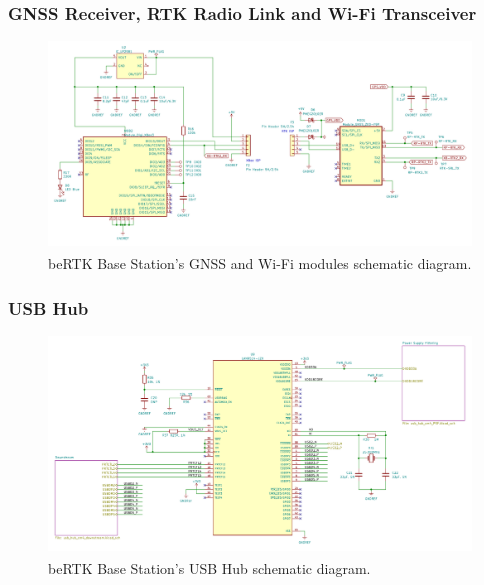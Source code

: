 
\subsubsection{GNSS Receiver, RTK Radio Link and Wi-Fi Transceiver}\label{sec:3232_ZEDF9P_XBEE3}

\begin{figure}[h]
	\centering
	\includegraphics[width=1.0\textwidth]{Chapters/Figures/chapter3/Modules_ZEDF9P_XBEE3.pdf}
	\caption{beRTK\textsuperscript{\textregistered} Base Station's GNSS and Wi-Fi modules schematic diagram.}
	\label{fig:ZEDF9P_XBEE3_circuit}
\end{figure}

\subsubsection{USB Hub}\label{sec:3233_LAN9514}

\begin{figure}[h]
	\centering
	\includegraphics[width=1.0\textwidth]{Chapters/Figures/chapter3/USB_Hub_1.pdf}
	\caption{beRTK\textsuperscript{\textregistered} Base Station's USB Hub schematic diagram.}
	\label{fig:USB_Hub_1_circuit}
\end{figure}

